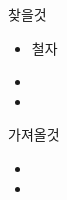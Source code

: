 \documentclass[aspectratio=1610,17pt,xcolor=pdftex,dvipsnames,table,handout]{beamer}
\begin{document}
		\begin{frame} [t,plain]

			\begin{block} { 찾을것 }
			\setlength{\leftmargini}{3em}			

			\begin{itemize}
			\item 철자 	
			\item 	
			\item 	
			\end{itemize}

			\end{block}			


			\begin{block} { 가져올것 }
			\setlength{\leftmargini}{3em}			

			\begin{itemize}
			\item 	
			\item 	
			\end{itemize}

			\end{block}			

								
		\end{frame}	 %




\end{document}
